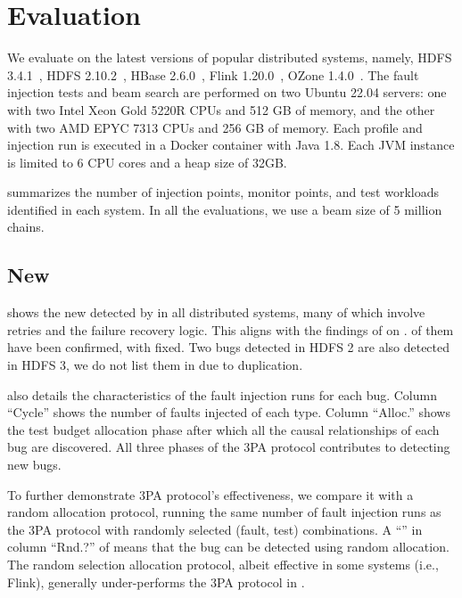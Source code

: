 \section{Evaluation}
\label{sec:eval}



We evaluate \tool on the latest versions of \NumOfSysTested popular distributed systems, namely, HDFS 3.4.1~\cite{apache-hdfs3}, HDFS 2.10.2~\cite{apache-hdfs}, HBase 2.6.0~\cite{apache-hbase}, Flink 1.20.0~\cite{apache-flink}, OZone 1.4.0~\cite{apache-ozone}.
The fault injection tests and beam search are performed on two Ubuntu 22.04 servers: one with two Intel Xeon Gold 5220R CPUs and 512 GB of memory, and the other with two AMD EPYC 7313 CPUs and 256 GB of memory. Each profile and injection run is executed in a Docker container with Java 1.8. Each JVM instance is limited to 6 CPU cores and a heap size of 32GB. 



 summarizes the number of injection points, monitor points, and test workloads identified in each system. 
In all the evaluations, we use a beam size of 5 million chains. 


\subsection{New \VCs}
\label{sec:eval:new-bug}



 shows the \NumOfNewVC new \vcs detected by \tool in all \NumOfSysTested distributed systems, many of which involve retries and the failure recovery logic. This aligns with the findings of \citet{qian2023vicious} on \vcs.  
\NUMOfConfirmedVC of them have been confirmed, with \NumOfFixedVC fixed. 
Two bugs detected in HDFS 2 are also detected in HDFS 3, we do not list them in  due to duplication. 

 also details the characteristics of the fault injection runs for each bug. Column ``Cycle'' shows the number of faults injected of each type.
Column ``Alloc.'' shows the test budget allocation phase after which all the causal relationships of each bug are discovered. All three phases of the 3PA protocol contributes to detecting new bugs. 

To further demonstrate 3PA protocol's effectiveness, we compare it with a random allocation protocol, running the same number of fault injection runs as the 3PA protocol with randomly selected (fault, test) combinations. A ``\Yes'' in column ``Rnd.?'' of   means that the bug can be detected using random allocation. The random selection allocation protocol, albeit effective in some systems (i.e., Flink), generally under-performs the 3PA protocol in \tool. 

